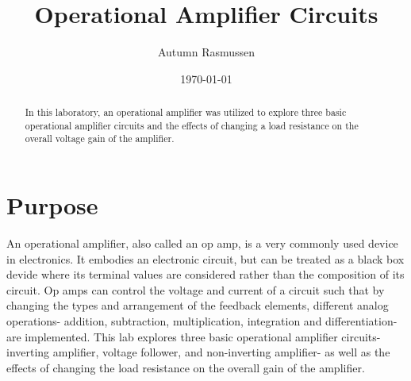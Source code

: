 \documentclass[prb,preprint]{revtex4-1}
\begin{document}
\title{Operational Amplifier Circuits}
\author{Autumn Rasmussen}


\date{\today}

\begin{abstract}
In this laboratory, an operational amplifier was utilized to explore three basic operational amplifier circuits and the effects of changing a load resistance on the overall voltage gain of the amplifier.
\end{abstract}

\maketitle


%
%
%
%
%
%
%
\section{Purpose}
An operational amplifier, also called an op amp, is a very commonly used device in electronics.
It embodies an electronic circuit, but can be treated as a black box devide where its terminal values are considered rather than the composition of its circuit. Op amps can control the voltage and current of a circuit such that by changing the types and arrangement of the feedback elements, different analog operations- addition, subtraction, multiplication, integration and differentiation- are implemented. This lab explores three basic operational amplifier circuits- inverting amplifier, voltage follower, and non-inverting amplifier- as well as the effects of changing the load resistance on the overall gain of the amplifier.
\end{document}
